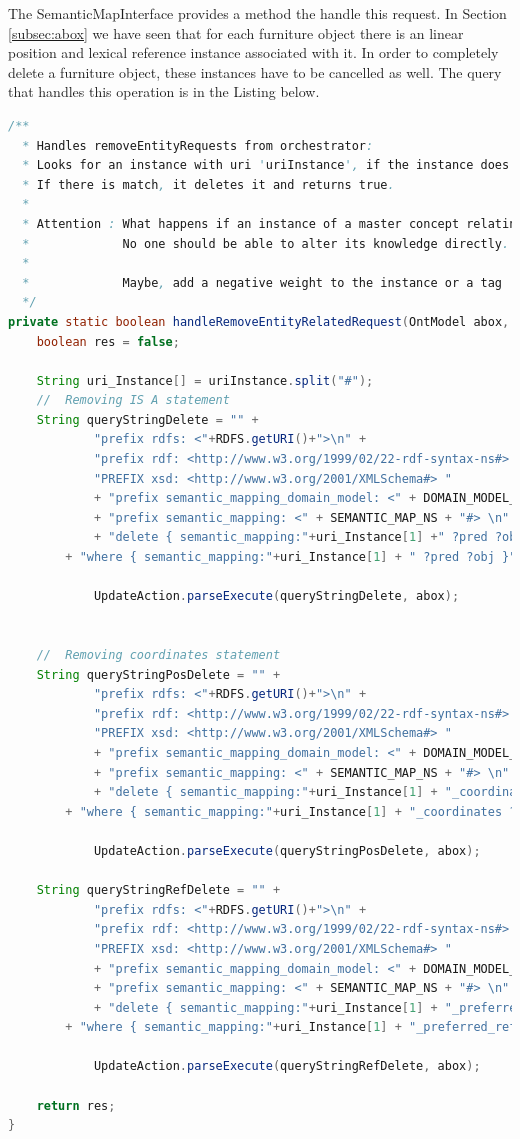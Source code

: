 The SemanticMapInterface provides a method the handle this request. In Section \ref{subsec:abox} we have seen that for each furniture object there is an linear position and lexical reference instance associated with it. In order to completely delete a furniture object, these instances have to be cancelled as well. The query that handles this operation is in the Listing below.
\begin{lstlisting}[language=Java]
/**
  * Handles removeEntityRequests from orchestrator:
  *	Looks for an instance with uri 'uriInstance', if the instance does not exist returns flase.
  * If there is match, it deletes it and returns true. 
  * 
  * Attention : What happens if an instance of a master concept relating two entities is deleted?
  * 			No one should be able to alter its knowledge directly.
  *	
  * 			Maybe, add a negative weight to the instance or a tag
  */
private static boolean handleRemoveEntityRelatedRequest(OntModel abox, String uriInstance) {
	boolean res = false;

	String uri_Instance[] = uriInstance.split("#");
	//  Removing IS A statement
	String queryStringDelete = "" + 
			"prefix rdfs: <"+RDFS.getURI()+">\n" +
			"prefix rdf: <http://www.w3.org/1999/02/22-rdf-syntax-ns#> \n"+
			"PREFIX xsd: <http://www.w3.org/2001/XMLSchema#> "				
			+ "prefix semantic_mapping_domain_model: <" + DOMAIN_MODEL_NS + "#> \n"
			+ "prefix semantic_mapping: <" + SEMANTIC_MAP_NS + "#> \n"
			+ "delete { semantic_mapping:"+uri_Instance[1] +" ?pred ?obj }  "
        + "where { semantic_mapping:"+uri_Instance[1] + " ?pred ?obj }";
			
			UpdateAction.parseExecute(queryStringDelete, abox);
	

	//  Removing coordinates statement
	String queryStringPosDelete = "" + 
			"prefix rdfs: <"+RDFS.getURI()+">\n" +
			"prefix rdf: <http://www.w3.org/1999/02/22-rdf-syntax-ns#> \n"+
			"PREFIX xsd: <http://www.w3.org/2001/XMLSchema#> "				
			+ "prefix semantic_mapping_domain_model: <" + DOMAIN_MODEL_NS + "#> \n"
			+ "prefix semantic_mapping: <" + SEMANTIC_MAP_NS + "#> \n"
			+ "delete { semantic_mapping:"+uri_Instance[1] + "_coordinates ?pred ?obj }  "
        + "where { semantic_mapping:"+uri_Instance[1] + "_coordinates ?pred ?obj }";
			
			UpdateAction.parseExecute(queryStringPosDelete, abox);
	
	String queryStringRefDelete = "" + 
			"prefix rdfs: <"+RDFS.getURI()+">\n" +
			"prefix rdf: <http://www.w3.org/1999/02/22-rdf-syntax-ns#> \n"+
			"PREFIX xsd: <http://www.w3.org/2001/XMLSchema#> "				
			+ "prefix semantic_mapping_domain_model: <" + DOMAIN_MODEL_NS + "#> \n"
			+ "prefix semantic_mapping: <" + SEMANTIC_MAP_NS + "#> \n"
			+ "delete { semantic_mapping:"+uri_Instance[1] + "_preferred_reference ?pred ?obj }  "
        + "where { semantic_mapping:"+uri_Instance[1] + "_preferred_reference ?pred ?obj }";
			
			UpdateAction.parseExecute(queryStringRefDelete, abox);
			
	return res;
}
\end{lstlisting}
\label{lst:delete}

